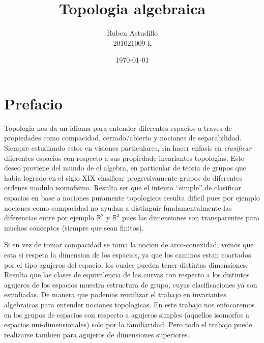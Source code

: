 \documentclass[letterpaper]{article}
\begin{document}
\title{Topologia algebraica}
\author{Ruben Astudillo \\ 201021009-k}
\date{\today}
\maketitle

\section{Prefacio}
Topologia nos da un idioma para entender diferentes espacios a traves de
propiedades como compacidad, cerrado/abierto y nociones de separabilidad.
Siempre estudiando estos en visiones particulares, sin hacer enfasis
en \emph{clasificar} diferentes espacios con respecto a sus propiedade invariantes
topologias. Este deseo proviene del mundo de el algebra, en particular de
teoria de grupos que habia logrado en el siglo XIX clasificar
progresivamente grupos de diferentes ordenes modulo isomofismo.
Resulta ser que el intento ``simple'' de clasificar espacios
en base a nociones puramente topologicos resulta dificil pues por ejemplo
nociones como compacidad no ayudan a distinguir fundamentalmente las
diferencias entre por ejemplo \(\mathbb{R}^2\) y  \(\mathbb{R}^3\) pues las
dimensiones son transparentes para muchos conceptos (siempre que sean finitos).

Si en vez de tomar compacidad se toma la nocion de arco-conexidad,
vemos que esta si respeta la dimension de los espacios, ya que los
caminos estan coartados por el tipo agujeros del espacio; los cuales
pueden tener distintas dimensiones. Resulta que las clases de
equivalencia de las curvas con respecto a los distintos agujeros de los
espacios muestra estructura de grupo, cuyas clasificaciones ya son
estudiadas. De manera que podemos reutilizar el trabajo en invariantes
algebraicas para entender nociones topologicas. En este trabajo nos
enfocaremos en los grupos de espacios con respecto a agujeros simples
(aquellos isomorfos a espacios uni-dimensionales) solo por la
familiaridad. Pero todo el trabajo puede realizarse tambien para agujeros
de dimensiones superiores.
\end{document}
